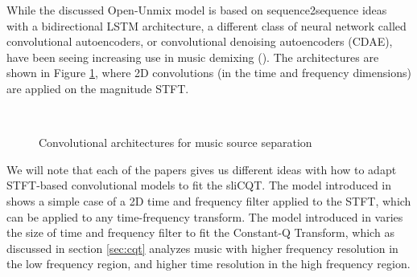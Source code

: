 \documentclass[report.tex]{subfiles}
\begin{document}
While the discussed Open-Unmix model is based on sequence2sequence ideas with a bidirectional LSTM architecture, a different class of neural network called convolutional autoencoders, or convolutional denoising autoencoders (CDAE), have been seeing increasing use in music demixing (\cite{plumbley1, plumbley2}). The architectures are shown in Figure \ref{fig:cdaes}, where 2D convolutions (in the time and frequency dimensions) are applied on the magnitude STFT.

\begin{figure}[ht]
	\centering
	\\
	\caption{Convolutional architectures for music source separation}
	\label{fig:cdaes}
\end{figure}

We will note that each of the papers gives us different ideas with how to adapt STFT-based convolutional models to fit the sliCQT. The model introduced in \textcite{plumbley1} shows a simple case of a 2D time and frequency filter applied to the STFT, which can be applied to any time-frequency transform. The model introduced in \textcite{plumbley2} varies the size of time and frequency filter to fit the Constant-Q Transform, which as discussed in section \ref{sec:cqt} analyzes music with higher frequency resolution in the low frequency region, and higher time resolution in the high frequency region.
\end{document}
